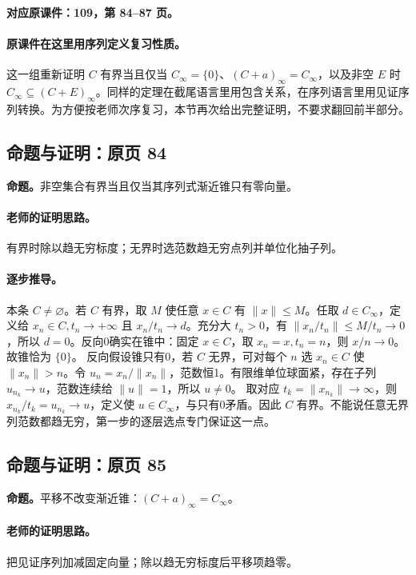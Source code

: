 \textbf{对应原课件：109，第 84--87 页。}


\paragraph{原课件在这里用序列定义复习性质。}
这一组重新证明 $C$ 有界当且仅当 $C_\infty=\{0\}$、$(C+a)_\infty=C_\infty$，以及非空 $E$ 时 $C_\infty\subseteq(C+E)_\infty$。同样的定理在截尾语言里用包含关系，在序列语言里用见证序列转换。为方便按老师次序复习，本节再次给出完整证明，不要求翻回前半部分。


\subsection{命题与证明：原页 84}

\textbf{命题。}非空集合有界当且仅当其序列式渐近锥只有零向量。

\paragraph{老师的证明思路。}有界时除以趋无穷标度；无界时选范数趋无穷点列并单位化抽子列。

\paragraph{逐步推导。}
本条 $C\ne\varnothing$。若 $C$ 有界，取 $M$ 使任意 $x\in C$ 有 $\|x\|\le M$。任取 $d\in C_\infty$，定义给 $x_n\in C,t_n\to+\infty$ 且 $x_n/t_n\to d$。充分大 $t_n>0$，有 $\|x_n/t_n\|\le M/t_n\to0$，所以 $d=0$。反向0确实在锥中：固定 $x\in C$，取 $x_n=x,t_n=n$，则 $x/n\to0$。故锥恰为 $\{0\}$。
反向假设锥只有0，若 $C$ 无界，可对每个 $n$ 选 $x_n\in C$ 使 $\|x_n\|>n$。令 $u_n=x_n/\|x_n\|$，范数恒1。有限维单位球面紧，存在子列 $u_{n_k}\to u$，范数连续给 $\|u\|=1$，所以 $u\ne0$。
取对应 $t_k=\|x_{n_k}\|\to\infty$，则 $x_{n_k}/t_k=u_{n_k}\to u$，定义使 $u\in C_\infty$，与只有0矛盾。因此 $C$ 有界。不能说任意无界列范数都趋无穷，第一步的逐层选点专门保证这一点。


\subsection{命题与证明：原页 85}

\textbf{命题。}平移不改变渐近锥：$(C+a)_\infty=C_\infty$。

\paragraph{老师的证明思路。}把见证序列加减固定向量；除以趋无穷标度后平移项趋零。

